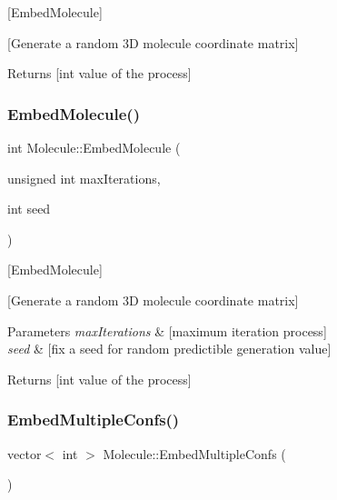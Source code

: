 \mbox{[}Embed\+Molecule\mbox{]} 

\mbox{[}Generate a random 3D molecule coordinate matrix\mbox{]}

\begin{DoxyReturn}{Returns}
\mbox{[}int value of the process\mbox{]} 
\end{DoxyReturn}
\mbox{\label{class_molecule_a49385d99cee0aba8c758a1420ba7c88d}} 
\subsubsection{\texorpdfstring{Embed\+Molecule()}{EmbedMolecule()}\hspace{0.1cm}{\footnotesize\ttfamily [2/2]}}
{\footnotesize\ttfamily int Molecule\+::\+Embed\+Molecule (\begin{DoxyParamCaption}\item[{unsigned int}]{max\+Iterations,  }\item[{int}]{seed }\end{DoxyParamCaption})}



\mbox{[}Embed\+Molecule\mbox{]} 

\mbox{[}Generate a random 3D molecule coordinate matrix\mbox{]}


\begin{DoxyParams}{Parameters}
{\em max\+Iterations} & \mbox{[}maximum iteration process\mbox{]} \\
\hline
{\em seed} & \mbox{[}fix a seed for random predictible generation value\mbox{]}\\
\hline
\end{DoxyParams}
\begin{DoxyReturn}{Returns}
\mbox{[}int value of the process\mbox{]} 
\end{DoxyReturn}
\mbox{\label{class_molecule_a05d32198715c54d6db4c139e4c9a3985}} 
\subsubsection{\texorpdfstring{Embed\+Multiple\+Confs()}{EmbedMultipleConfs()}\hspace{0.1cm}{\footnotesize\ttfamily [1/2]}}
{\footnotesize\ttfamily vector$<$ int $>$ Molecule\+::\+Embed\+Multiple\+Confs (\begin{DoxyParamCaption}{ }\end{DoxyParamCaption})}




